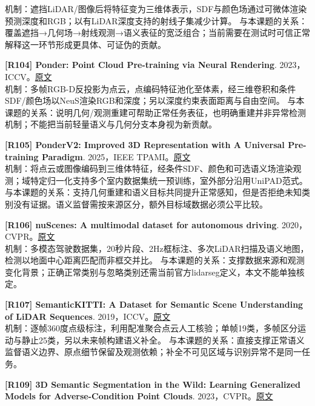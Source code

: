 \documentclass[11pt,a4paper]{article}
\begin{document}
机制：遮挡LiDAR/图像后将特征变为三维体表示，SDF与颜色场通过可微体渲染预测深度和RGB；以有LiDAR深度支持的射线子集减少计算。 与本课题的关系：覆盖遮挡→几何场→射线观测→语义表征的宽泛组合；当前需要在测试时可信正常解释这一环节形成更具体、可证伪的贡献。\par\medskip
\hypertarget{R104}{}\textbf{[R104] Ponder: Point Cloud Pre-training via Neural Rendering}. 2023，ICCV。\href{https://openaccess.thecvf.com/content/ICCV2023/papers/Huang_Ponder_Point_Cloud_Pre-training_via_Neural_Rendering_ICCV_2023_paper.pdf}{原文}\\
机制：多帧RGB-D反投影为点云，点编码特征池化至体素，经三维卷积和条件SDF/颜色场以NeuS渲染RGB和深度；另以深度约束表面距离与自由空间。 与本课题的关系：说明几何/观测重建可帮助正常任务表征，也明确重建并非异常检测机制；不能把当前轻量语义与几何分支本身视为新贡献。\par\medskip
\hypertarget{R105}{}\textbf{[R105] PonderV2: Improved 3D Representation with A Universal Pre-training Paradigm}. 2025，IEEE TPAMI。\href{https://arxiv.org/pdf/2310.08586}{原文}\\
机制：将点云或图像编码到三维体特征，经条件SDF、颜色和可选语义场渲染观测；域特定归一化支持多个室内数据集统一预训练，室外部分沿用UniPAD范式。 与本课题的关系：支持几何重建和语义目标共同提升正常感知，但是否拒绝未知类别没有证据。语义监督需按来源区分，额外目标域数据必须公平比较。\par\medskip
\hypertarget{R106}{}\textbf{[R106] nuScenes: A multimodal dataset for autonomous driving}. 2020，CVPR。\href{https://arxiv.org/pdf/1903.11027}{原文}\\
机制：多模态驾驶数据集，20秒片段、2Hz框标注、多次LiDAR扫描及语义地图，检测以地面中心距离匹配而非框交并比。 与本课题的关系：支撑数据来源和观测变化背景；正确正常类别与忽略类别还需当前官方lidarseg定义，本文不能单独核定。\par\medskip
\hypertarget{R107}{}\textbf{[R107] SemanticKITTI: A Dataset for Semantic Scene Understanding of LiDAR Sequences}. 2019，ICCV。\href{https://arxiv.org/pdf/1904.01416}{原文}\\
机制：逐帧360度点级标注，利用配准聚合点云人工核验；单帧19类，多帧区分运动与静止25类，另以未来帧构建语义补全。 与本课题的关系：直接支撑正常语义监督语义边界、原点细节保留及观测依赖；补全不可见区域与识别异常不是同一任务。\par\medskip
\hypertarget{R109}{}\textbf{[R109] 3D Semantic Segmentation in the Wild: Learning Generalized Models for Adverse-Condition Point Clouds}. 2023，CVPR。\href{https://arxiv.org/pdf/2304.00690}{原文}\\
\end{document}
